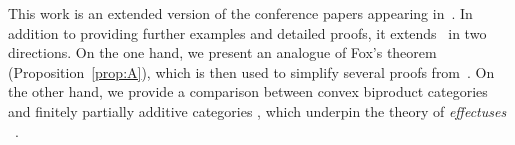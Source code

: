 This work is an extended version of the conference papers appearing in~\cite{probbooltapesfossacs,completenessprobbooltaperCONCUR26}. In addition to providing further examples and detailed proofs, it extends~\cite{probbooltapesfossacs,completenessprobbooltaperCONCUR26} in two directions. On the one hand, we present an analogue of Fox's theorem (Proposition~\ref{prop:A}), which is then used to simplify several proofs from~\cite{probbooltapesfossacs}. On the other hand, we provide a comparison between convex biproduct categories and finitely partially additive categories \cite{chophd,manes}, which underpin the theory of \textit{effectuses} ~\cite{introductioneffectus}.







